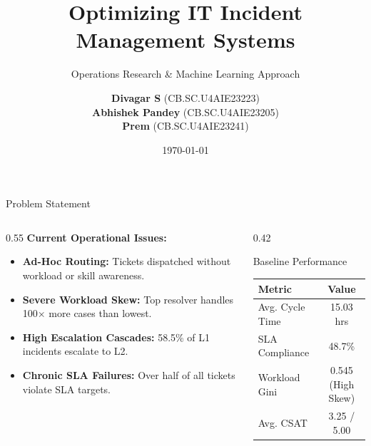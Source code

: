 \documentclass[10pt,aspectratio=169]{beamer}
\title[Optimizing Incident Management]{Optimizing IT Incident Management Systems}
\subtitle{Operations Research \& Machine Learning Approach}
\author[Divagar, Abhishek, Prem]{
    \textbf{Divagar S} \quad (CB.SC.U4AIE23223) \\
    \textbf{Abhishek Pandey} \quad (CB.SC.U4AIE23205) \\
    \textbf{Prem} \quad (CB.SC.U4AIE23241)
}
\institute[Amrita Vishwa Vidyapeetham]{Department of Artificial Intelligence \\ Amrita Vishwa Vidyapeetham}
\date{\today}
\begin{document}
\begin{frame}
    \titlepage
\end{frame}

\begin{frame}{Problem Statement}
    \begin{columns}[c]
        \begin{column}{0.55\textwidth}
            \textbf{Current Operational Issues:}
            \vspace{0.2cm}
            \begin{itemize}
                \setlength\itemsep{0.7em}
                \item \textbf{Ad-Hoc Routing:} Tickets dispatched without workload or skill awareness.
                \item \textbf{Severe Workload Skew:} Top resolver handles 100$\times$ more cases than lowest.
                \item \textbf{High Escalation Cascades:} 58.5\% of L1 incidents escalate to L2.
                \item \textbf{Chronic SLA Failures:} Over half of all tickets violate SLA targets.
            \end{itemize}
        \end{column}
        \begin{column}{0.42\textwidth}
            \begin{block}{Baseline Performance}
                \centering
                \vspace{0.15cm}
                \begin{tabular}{lc}
                    \toprule
                    \textbf{Metric} & \textbf{Value} \\
                    \midrule
                    Avg. Cycle Time & 15.03 hrs \\
                    SLA Compliance & 48.7\% \\
                    Workload Gini & 0.545 (High Skew) \\
                    Avg. CSAT & 3.25 / 5.00 \\
                    \bottomrule
                \end{tabular}
                \vspace{0.15cm}
            \end{block}
        \end{column}
    \end{columns}
\end{frame}
\end{document}
